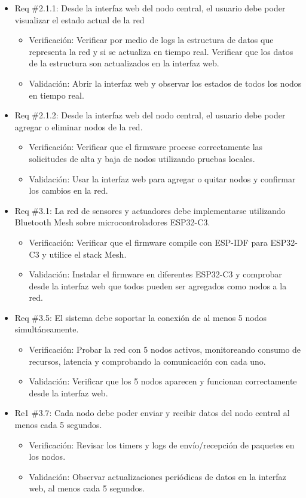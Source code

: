 \documentclass[
11pt, %
]{charter}
\begin{document}
\begin{itemize}
\item Req \#2.1.1: Desde la interfaz web del nodo central, el usuario debe poder visualizar el estado actual de la red
\begin{itemize}
	\item Verificación: Verificar por medio de logs la estructura de datos que representa la red y si se actualiza en tiempo real. Verificar que los datos de la estructura son actualizados en la interfaz web.
	\item Validación: Abrir la interfaz web y observar los estados de todos los nodos en tiempo real.
\end{itemize}


\item Req \#2.1.2: Desde la interfaz web del nodo central, el usuario debe poder agregar o eliminar nodos de la red.
\begin{itemize}
	\item Verificación: Verificar que el firmware procese correctamente las solicitudes de alta y baja de nodos utilizando pruebas locales.
	\item Validación: Usar la interfaz web para agregar o quitar nodos y confirmar los cambios en la red.
\end{itemize}

\item Req \#3.1: La red de sensores y actuadores debe implementarse utilizando Bluetooth Mesh sobre microcontroladores ESP32-C3.
\begin{itemize}
	\item Verificación: Verificar que el firmware compile con ESP-IDF para ESP32-C3 y utilice el stack Mesh.
	\item Validación: Instalar el firmware en diferentes ESP32-C3 y comprobar desde la interfaz web que todos pueden ser agregados como nodos a la red.
\end{itemize}


\item Req \#3.5: El sistema debe soportar la conexión de al menos 5 nodos simultáneamente.
\begin{itemize}
	\item Verificación: Probar la red con 5 nodos activos, monitoreando consumo de recursos, latencia y comprobando la comunicación con cada uno.
	\item Validación: Verificar que los 5 nodos aparecen y funcionan correctamente desde la interfaz web.
\end{itemize}


\item Re1 \#3.7: Cada nodo debe poder enviar y recibir datos del nodo central al menos cada 5 segundos.
\begin{itemize}
	\item Verificación: Revisar los timers y logs de envío/recepción de paquetes en los nodos.
	\item Validación: Observar actualizaciones periódicas de datos en la interfaz web, al menos cada 5 segundos.
\end{itemize}



\end{itemize}
\end{document}
